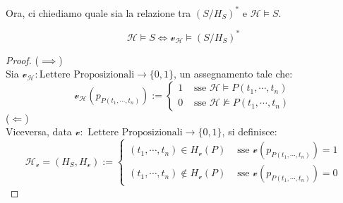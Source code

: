 Ora, ci chiediamo quale sia la relazione tra $(S/H_S)^*$ e $\mathscr{H} \models S$.
\begin{lemn}
\label{lem:herbrand-sodd}
  $$
  \mathscr{H} \models S \iff \mathcal{v}_{\mathscr{H}} \models (S/H_S)^*
  $$
\end{lemn}
\begin{proof} ($\implies$) \\
Sia $\mathcal{v}_{\mathscr{H}}: \text{Lettere Proposizionali} \rightarrow \{0,1\}$, un assegnamento tale che:
$$
\mathcal{v}_{\mathscr{H}}(p_{P(t_1, \cdots, t_n)}) :=
\begin{cases}
  1 & \text{ sse } \mathscr{H} \models P(t_1, \cdots, t_n) \\
  0 & \text{ sse } \mathscr{H} \nvDash P(t_1, \cdots, t_n)
\end{cases}
$$
($\Longleftarrow$) \\
Viceversa, data $\mathcal{v}: \text{ Lettere Proposizionali} \rightarrow \{0,1\}$, si definisce:
$$
\mathscr{H}_{\mathcal{v}}= (H_S, H_{\mathcal{v}}) :=
\begin{cases}
  (t_1, \cdots, t_n) \in H_{\mathcal{v}}(P) & \text{ sse } \mathcal{v}(p_{P(t_1, \cdots, t_n)}) = 1 \\
  (t_1, \cdots, t_n) \not\in H_{\mathcal{v}}(P) & \text{ sse } \mathcal{v}(p_{P(t_1, \cdots, t_n)}) = 0
\end{cases}
$$
\end{proof}

